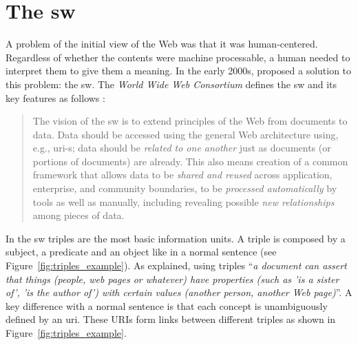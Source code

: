 \section{The \acl{sw}}
\label{sec:soa_sw}

A problem of the initial view of the Web was that it was human-centered.
Regardless of whether the contents were machine processable, a human needed to interpret them to give them a meaning.
In the early 2000s, \citet{berners-lee_semantic_2001} proposed a solution to this problem: the \acf{sw}.
The \emph{World Wide Web Consortium} defines the \ac{sw} and its key features as follows \citep{semanticWeb-FAQ}:
\begin{quote}
The vision of the \acl{sw} is to extend principles of the Web from documents to data.
Data should be accessed using the general Web architecture using, e.g., \acs{uri}-s;
data should be \emph{related to one another} just as documents (or portions of documents) are already.
This also means creation of a common framework that allows data to be \emph{shared and reused} across application, enterprise, and community boundaries,
to be \emph{processed automatically} by tools as well as manually, including revealing possible \emph{new relationships} among pieces of data.
\end{quote}


In the \ac{sw} triples are the most basic information units.
A triple is composed by a subject, a predicate and an object like in a normal sentence (see Figure~\ref{fig:triples_example}).
As \citeauthor{berners-lee_semantic_2001} explained, using triples ``\emph{a document can assert that things (people, web pages or whatever) have properties (such as 'is a sister of', 'is the author of') with certain values (another person, another Web page)}''.
A key difference with a normal sentence is that each concept is unambiguously defined by an \acs{uri}.
These URIs form links between different triples as shown in Figure~\ref{fig:triples_example}.


